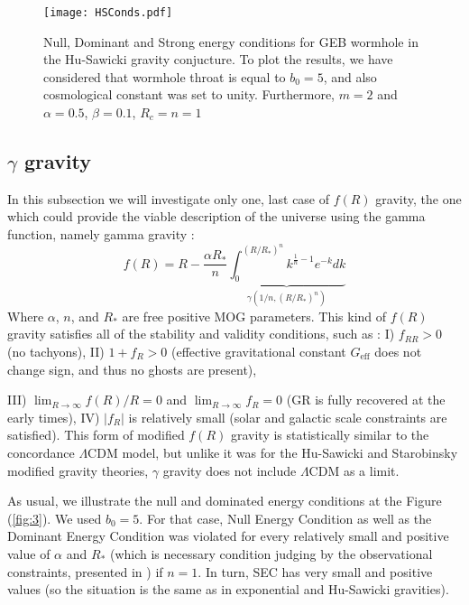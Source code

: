 \begin{widetext}

\begin{figure}[!htbp]
    \centering
    \texttt{[image: HSConds.pdf]}
    \caption{Null, Dominant and Strong energy conditions for GEB wormhole in the Hu-Sawicki gravity conjucture. To plot the results, we have considered that wormhole throat is equal to $b_0=5$, and also cosmological constant was set to unity. Furthermore, $m=2$ and $\alpha=0.5$, $\beta=0.1$, $R_c=n=1$}
    \label{fig:2}
\end{figure}
\end{widetext}

\subsection{$\gamma$ gravity}

In this subsection we will investigate only one, last case of $f(R)$ gravity, the one which could provide the viable description of the universe using the gamma function, namely gamma gravity \cite{ref73}:
\begin{equation}
    f(R) = R- \frac{\alpha R_*}{n}\underbrace{\int ^{(R/R_*)^n}_0 k^{\frac{1}{n}-1}e^{-k}dk}_\text{$\gamma(1/n,(R/R_*)^n)$}
\end{equation}
Where $\alpha$, $n$, and $R_*$ are free positive MOG parameters. This kind of $f(R)$ gravity satisfies all of the stability and validity conditions, such as \cite{ref74}:
I) $f_{RR}>0$ (no tachyons), II)
$1+f_{R}>0$ (effective gravitational constant $G_{\mathrm{eff}}$ does not change sign, and thus no ghosts are present),

III)  
$\lim_{R\to\infty}f(R)/R=0$ and $\lim_{R\to\infty}f_{R}=0$ (GR is fully recovered at the early times), IV) $|f_{R}|$ is relatively small (solar and galactic scale constraints are satisfied).
This form of modified $f(R)$ gravity is statistically similar to the concordance $\Lambda\mathrm{CDM}$ model, but unlike it was for the Hu-Sawicki \cite{ref71} and Starobinsky \cite{ref75} modified gravity theories, $\gamma$ gravity does not include $\Lambda\mathrm{CDM}$ as a limit. 

As usual, we illustrate the null and dominated energy conditions at the Figure (\ref{fig:3}). We used $b_0=5$. For that case, Null Energy Condition as well as the Dominant Energy Condition was violated for every relatively small and positive value of $\alpha$ and $R_*$ (which is necessary condition judging by the observational constraints, presented in \cite{ref76}) if $n=1$. In turn, SEC has very small and positive values (so the situation is the same as in exponential and Hu-Sawicki gravities).

